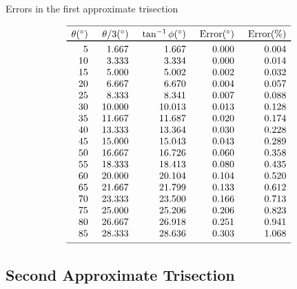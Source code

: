 \begin{table}[t]
\caption{Errors in the first approximate trisection}\label{t.trisect-first}
\[
%
\begin{array}{r@{\hspace{5mm}}r@{\hspace{5mm}}r@{\hspace{5mm}}r@{\hspace{5mm}}r}
\hline
\noalign{\smallskip}
\theta ({}^\circ) & \theta/3 ({}^\circ)& \tan^{-1} \phi ({}^\circ) & \mathrm{Error} ({}^\circ) & \mathrm{Error (\%)}\\\svhline
\noalign{\smallskip}
  5 &    1.667 &    1.667  &     0.000 &    0.004 \\
 10 &    3.333 &    3.334  &     0.000 &    0.014 \\
 15 &    5.000 &    5.002  &     0.002 &    0.032 \\
 20 &    6.667 &    6.670  &     0.004 &    0.057 \\
 25 &    8.333 &    8.341  &     0.007 &    0.088 \\
 30 &   10.000 &   10.013  &     0.013 &    0.128 \\
 35 &   11.667 &   11.687  &     0.020 &    0.174 \\
 40 &   13.333 &   13.364  &     0.030 &    0.228 \\
 45 &   15.000 &   15.043  &     0.043 &    0.289 \\
 50 &   16.667 &   16.726  &     0.060 &    0.358 \\
 55 &   18.333 &   18.413  &     0.080 &    0.435 \\
 60 &   20.000 &   20.104  &     0.104 &    0.520 \\
 65 &   21.667 &   21.799  &     0.133 &    0.612 \\
 70 &   23.333 &   23.500  &     0.166 &    0.713 \\
 75 &   25.000 &   25.206  &     0.206 &    0.823 \\
 80 &   26.667 &   26.918  &     0.251 &    0.941 \\
 85 &   28.333 &   28.636  &     0.303 &    1.068 \\
 \noalign{\smallskip}
 \hline
 \end{array}
\]
\end{table}

\subsection{Second Approximate Trisection}

